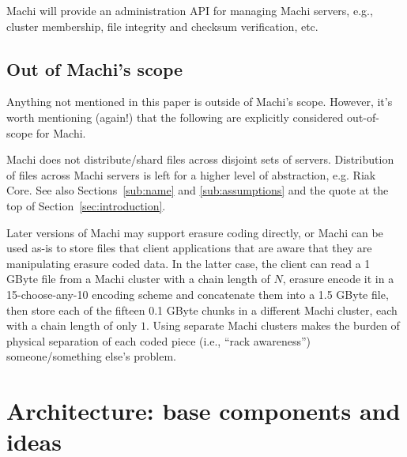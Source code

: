 \documentclass[preprint,10pt]{sigplanconf}
\begin{document}
Machi will provide an administration API for managing Machi servers, e.g.,
cluster membership, file integrity and checksum verification, etc.



\subsection{Out of Machi's scope}

Anything not mentioned in this paper is outside of Machi's scope.
However, it's worth mentioning (again!) that the following are explicitly
considered out-of-scope for Machi.

  Machi does not distribute/shard files across disjoint sets of servers.
  Distribution of files across Machi servers is left for a higher
  level of abstraction, e.g. Riak Core.  See also
  Sections~\ref{sub:name} and \ref{sub:assumptions} and the quote at
  the top of Section~\ref{sec:introduction}.

  Later versions of Machi may support erasure
  coding directly, or Machi can be used as-is to store files that
  client applications that are aware that they are manipulating
  erasure coded data.  In the latter case,
  the client can read a 1 GByte file from a Machi cluster with a chain
  length of $N$, erasure encode it in a
  15-choose-any-10 encoding scheme and concatenate them into a 1.5 GByte file,
  then store each of the fifteen
  0.1 GByte chunks in a different Machi cluster, each with a chain
  length of only $1$.  Using separate Machi clusters makes the
  burden of physical separation of each coded piece (i.e., ``rack
  awareness'') someone/something else's problem.

\section{Architecture: base components and ideas}
\end{document}

